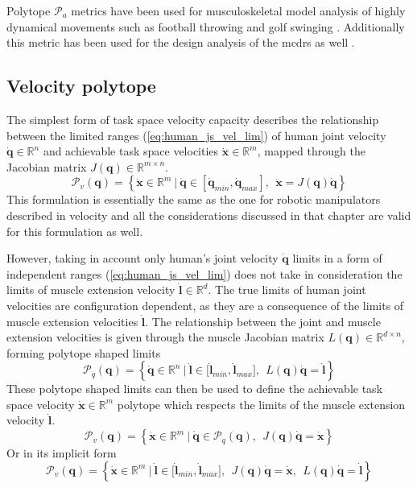 Polytope $\mathcal{P}_a$ metrics have been used for musculoskeletal model analysis of highly dynamical movements such as football throwing \cite{khatib2009robotics} and golf swinging \cite{demircan2012muscle}. Additionally this metric has been used for the design analysis of the \glspl{mcdr} as well \cite{sheng2020operational}.

\subsection{Velocity polytope}
\label{ch:human_vel_poly}
The simplest form of task space velocity capacity describes the relationship between the limited ranges (\ref{eq:human_js_vel_lim}) of human joint velocity $\dot{\bm{q}} \in \mathbb{R}^n$ and achievable task space velocities $\dot{\bm{x}} \in \mathbb{R}^m$, mapped through the Jacobian matrix $J(\bm{q}) \in \mathbb{R}^{m\times n}$.
\begin{equation}
    \mathcal{P}_v(\bm{q}) = \left\{ \dot{\bm{x}} \in \mathbb{R}^m ~|~ \dot{\bm{q}}\in\left[\dot{\bm{q}}_{min}, \dot{\bm{q}}_{max} \right], ~~ \dot{\bm{x}} = J(\bm{q})\dot{\bm{q}} \right\}
\end{equation}
This formulation is essentially the same as the one for robotic manipulators described in velocity  and all the considerations discussed in that chapter are valid for this formulation as well.

However, taking in account only human's joint velocity $\dot{\bm{q}}$ limits in a form of independent ranges (\ref{eq:human_js_vel_lim}) does not take in consideration the limits of muscle extension velocity $\dot{\bm{l}}\in\mathbb{R}^d$. The true limits of human joint velocities are configuration dependent, as they are a consequence of the limits of muscle extension velocities $\dot{\bm{l}}$. The relationship between the joint and muscle extension velocities is given through the muscle Jacobian matrix $L(\bm{q}) \in \mathbb{R}^{d\times n}$, forming polytope shaped limits
\begin{equation}
    \mathcal{P}_{\dot{q}}(\bm{q}) = \left\{ \dot{\bm{q}} \in \mathbb{R}^n ~|~ \dot{\bm{l}}\in\big[\dot{\bm{l}}_{min}, \dot{\bm{l}}_{max} \big], ~~ L(\bm{q})\dot{\bm{q}} = \dot{\bm{l}} \right\}
    \label{eq:human_poly_joint_vel}
\end{equation}
These polytope shaped limits can then be used to define the achievable task space velocity $\dot{\bm{x}}\in \mathbb{R}^m$ polytope which respects the limits of the muscle extension velocity $\dot{\bm{l}}$.
\begin{equation}
    \mathcal{P}_v(\bm{q}) = \left\{ \dot{\bm{x}} \in \mathbb{R}^m ~|~ \dot{\bm{q}}\in  \mathcal{P}_{\dot{q}}(\bm{q}), ~~ J(\bm{q})\dot{\bm{q}} = \dot{\bm{x}} \right\}
    \label{eq:velocity_polytope_human_ver_poly_lim}
\end{equation}
Or in its implicit form
\begin{equation}
    \mathcal{P}_v(\bm{q}) = \left\{ \dot{\bm{x}} \in \mathbb{R}^m ~|~ \dot{\bm{l}}\in\big[\dot{\bm{l}}_{min}, \dot{\bm{l}}_{max} \big], ~~ J(\bm{q})\dot{\bm{q}} = \dot{\bm{x}}, ~~ L(\bm{q})\dot{\bm{q}} = \dot{\bm{l}} \right\}
    \label{eq:velocity_polytope_human}
\end{equation}

